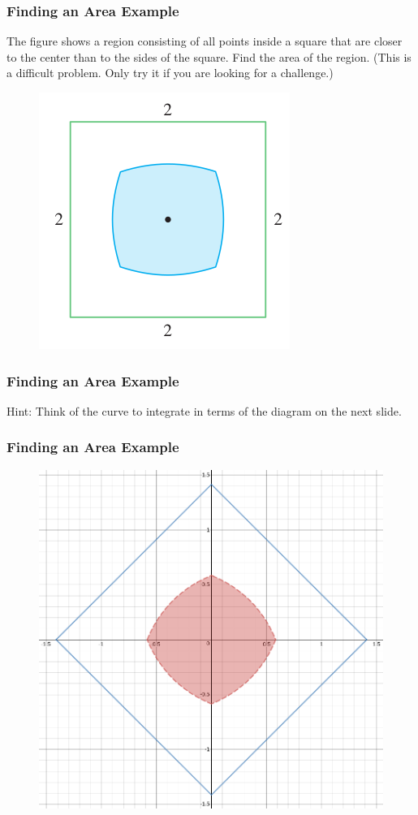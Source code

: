 \documentclass[xcolor=dvipsnames]{beamer}
\begin{document}
\begin{frame}
  \frametitle{Finding an Area Example}
  {\ubung} The figure shows a region consisting of all points inside a
  square that are closer to the center than to the sides of the
  square. Find the area of the region. (This is a difficult problem.
  Only try it if you are looking for a challenge.)
  \begin{figure}[h]
    \includegraphics[scale=0.5]{./diagrams/squarish.png}
  \end{figure}
\end{frame}

\begin{frame}
  \frametitle{Finding an Area Example}
  Hint: Think of the curve to integrate in terms of the diagram on the
  next slide.
\end{frame}

\begin{frame}
  \frametitle{Finding an Area Example}
  \begin{figure}[h]
    \includegraphics[scale=0.3]{./diagrams/squarish-desmos.png}
  \end{figure}
\end{frame}
\end{document}

